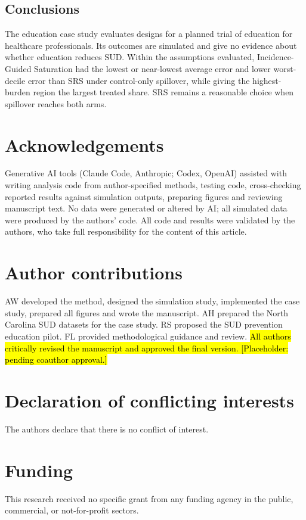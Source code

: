 \documentclass[Afour,sagev,times]{sagej}
\begin{document}
\subsection{Conclusions}
The education case study evaluates designs for a planned trial of education for healthcare professionals. Its outcomes are simulated and give no evidence about whether education reduces SUD. Within the assumptions evaluated, Incidence-Guided Saturation had the lowest or near-lowest average error and lower worst-decile error than SRS under control-only spillover, while giving the highest-burden region the largest treated share. SRS remains a reasonable choice when spillover reaches both arms.

\ifctjreading
\raggedright
\fi
\section*{Acknowledgements}
Generative AI tools (Claude Code, Anthropic; Codex, OpenAI) assisted with writing analysis code from author-specified methods, testing code, cross-checking reported results against simulation outputs, preparing figures and reviewing manuscript text. No data were generated or altered by AI; all simulated data were produced by the authors' code. All code and results were validated by the authors, who take full responsibility for the content of this article.
\section*{Author contributions}
AW developed the method, designed the simulation study, implemented the case study, prepared all figures and wrote the manuscript. AH prepared the North Carolina SUD datasets for the case study. RS proposed the SUD prevention education pilot. FL provided methodological guidance and review. \hl{All authors critically revised the manuscript and approved the final version. [Placeholder: pending coauthor approval.]}
\section*{Declaration of conflicting interests}
The authors declare that there is no conflict of interest.
\section*{Funding}
This research received no specific grant from any funding agency in the public, commercial, or not-for-profit sectors.
\end{document}

